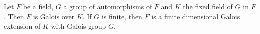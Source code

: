 Let $F$ be a field, $G$ a group of automorphisms of $F$ and $K$ the fixed field of $G$ in $F$. Then $F$ is Galois over $K$. If $G$ is finite, then $F$ is a finite dimensional Galois extension of $K$ with Galois group $G$.
